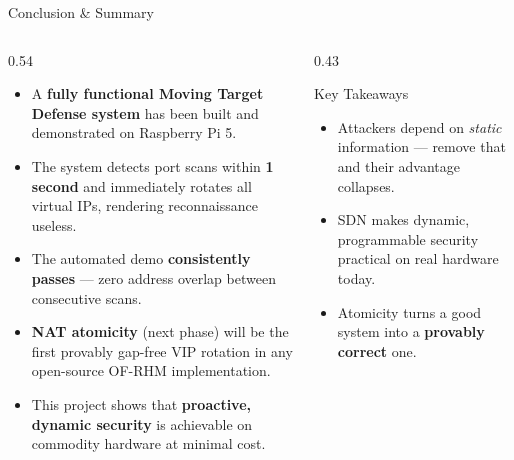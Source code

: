 \documentclass[aspectratio=169,10pt]{beamer}
\begin{document}
\begin{frame}{Conclusion \& Summary}
  \begin{columns}[T]
    \begin{column}{0.54\textwidth}
      \begin{itemize}\setlength\itemsep{6pt}
        \item A \textbf{fully functional Moving Target Defense system} has been built and demonstrated on Raspberry Pi 5.
        \item The system detects port scans within \textbf{1 second} and immediately rotates all virtual IPs, rendering reconnaissance useless.
        \item The automated demo \textbf{consistently passes} --- zero address overlap between consecutive scans.
        \item \textbf{NAT atomicity} (next phase) will be the first provably gap-free VIP rotation in any open-source OF-RHM implementation.
        \item This project shows that \textbf{proactive, dynamic security} is achievable on commodity hardware at minimal cost.
      \end{itemize}
    \end{column}
    \begin{column}{0.43\textwidth}
      \vspace{0.2cm}
      \begin{exampleblock}{Key Takeaways}
        \begin{itemize}\small\setlength\itemsep{4pt}
          \item Attackers depend on \emph{static} information --- remove that and their advantage collapses.
          \item SDN makes dynamic, programmable security practical on real hardware today.
          \item Atomicity turns a good system into a \textbf{provably correct} one.
        \end{itemize}
      \end{exampleblock}
      \vspace{0.35cm}
      \centering
    \end{column}
  \end{columns}
\end{frame}
\end{document}
